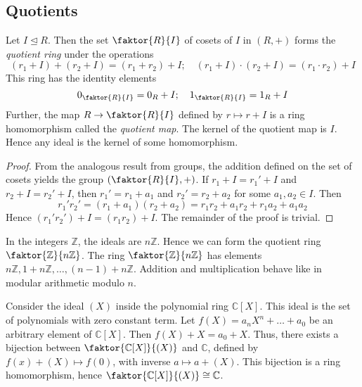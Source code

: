 \subsection{Quotients}
\begin{theorem}
	Let \( I \trianglelefteq R \).
	Then the set \( \faktor{R}{I} \) of cosets of \( I \) in \( (R, +) \) forms the \textit{quotient ring} under the operations
	\[
		(r_1 + I) + (r_2 + I) = (r_1 + r_2) + I;\quad (r_1 + I) \cdot (r_2 + I) = (r_1 \cdot r_2) + I
	\]
	This ring has the identity elements
	\[
		0_{\faktor{R}{I}} = 0_R + I;\quad 1_{\faktor{R}{I}} = 1_R + I
	\]
	Further, the map \( R \to \faktor{R}{I} \) defined by \( r \mapsto r + I \) is a ring homomorphism called the \textit{quotient map}.
	The kernel of the quotient map is \( I \).
	Hence any ideal is the kernel of some homomorphism.
\end{theorem}
\begin{proof}
	From the analogous result from groups, the addition defined on the set of cosets yields the group \( \qty(\faktor{R}{I}, +) \).
	If \( r_1 + I = r_1' + I \) and \( r_2 + I = r_2' + I \), then \( r_1' = r_1 + a_1 \) and \( r_2' = r_2 + a_2 \) for some \( a_1, a_2 \in I \).
	Then
	\[
		r_1' r_2' = (r_1 + a_1)(r_2 + a_2) = r_1 r_2 + a_1 r_2 + r_1 a_2 + a_1 a_2
	\]
	Hence \( (r_1' r_2') + I = (r_1 r_2) + I \).
	The remainder of the proof is trivial.
\end{proof}
\begin{example}
	In the integers \( \mathbb Z \), the ideals are \( n\mathbb Z \).
	Hence we can form the quotient ring \( \faktor{\mathbb Z}{n\mathbb Z} \).
	The ring \( \faktor{\mathbb Z}{n\mathbb Z} \) has elements \( n\mathbb Z, 1 + n\mathbb Z, \dots, (n-1) + n\mathbb Z \).
	Addition and multiplication behave like in modular arithmetic modulo \( n \).
\end{example}
\begin{example}
	Consider the ideal \( (X) \) inside the polynomial ring \( \mathbb C[X] \).
	This ideal is the set of polynomials with zero constant term.
	Let \( f(X) = a_n X^n + \dots + a_0 \) be an arbitrary element of \( \mathbb C[X] \).
	Then \( f(X) + X = a_0 + X \).
	Thus, there exists a bijection between \( \faktor{\mathbb C[X]}{(X)} \) and \( \mathbb C \), defined by \( f(x) + (X) \mapsto f(0) \), with inverse \( a \mapsto a + (X) \).
	This bijection is a ring homomorphism, hence \( \faktor{\mathbb C[X]}{(X)} \cong \mathbb C \).
\end{example}
